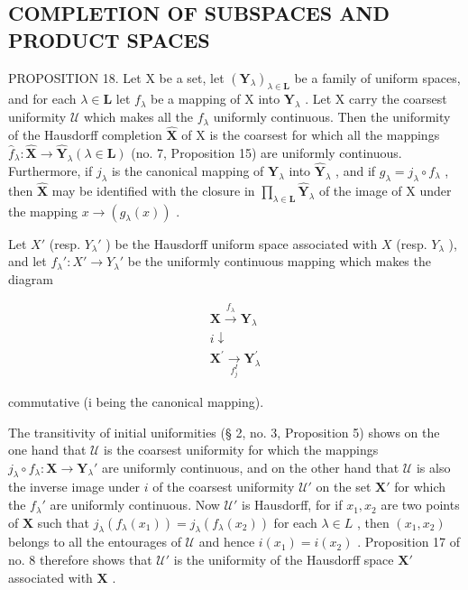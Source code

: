 \subsection{COMPLETION OF SUBSPACES AND PRODUCT SPACES}

PROPOSITION 18. Let X be a set, let \((\mathbf{Y}_{\lambda})_{\lambda \in \mathbf{L}}\) be a family of uniform spaces, and for each \(\lambda \in \mathbf{L}\) let \(f_{\lambda}\) be a mapping of X into \(\mathbf{Y}_{\lambda}\) . Let X carry the coarsest uniformity \(\mathcal{U}\) which makes all the \(f_{\lambda}\) uniformly continuous. Then the uniformity of the Hausdorff completion \(\hat{\mathbf{X}}\) of X is the coarsest for which all the mappings \(\hat{f}_{\lambda} \colon \hat{\mathbf{X}} \to \hat{\mathbf{Y}}_{\lambda} (\lambda \in \mathbf{L})\) (no. 7, Proposition 15) are uniformly continuous. Furthermore, if \(j_{\lambda}\) is the canonical mapping of \(\mathbf{Y}_{\lambda}\) into \(\hat{\mathbf{Y}}_{\lambda}\) , and if \(g_{\lambda} = j_{\lambda} \circ f_{\lambda}\) , then \(\hat{\mathbf{X}}\) may be identified with the closure in \(\prod_{\lambda \in \mathbf{L}} \hat{\mathbf{Y}}_{\lambda}\) of the image of X under the mapping \(x \to (g_{\lambda}(x))\) .

Let \(X'\) (resp. \(Y_{\lambda}'\) ) be the Hausdorff uniform space associated with \(X\) (resp. \(Y_{\lambda}\) ), and let \(f_{\lambda}' \colon X' \to Y_{\lambda}'\) be the uniformly continuous mapping which makes the diagram

\[
\begin{array}{c} \mathbf {X} \xrightarrow {f _ {\lambda}} \mathbf {Y} _ {\lambda} \\ i \downarrow \\ \mathbf {X ^ {\prime}} \xrightarrow [ f _ {j} ^ {I} ]{} \mathbf {Y} _ {\lambda} ^ {\prime} \end{array}
\]

commutative (i being the canonical mapping).

The transitivity of initial uniformities (§ 2, no. 3, Proposition 5) shows on the one hand that \(\mathcal{U}\) is the coarsest uniformity for which the mappings \(j_{\lambda} \circ f_{\lambda}: \mathbf{X} \to \mathbf{Y}_{\lambda}'\) are uniformly continuous, and on the other hand that \(\mathcal{U}\) is also the inverse image under \(i\) of the coarsest uniformity \(\mathcal{U}'\) on the set \(\mathbf{X}'\) for which the \(f_{\lambda}'\) are uniformly continuous. Now \(\mathcal{U}'\) is Hausdorff, for if \(x_{1}, x_{2}\) are two points of \(\mathbf{X}\) such that \(j_{\lambda}(f_{\lambda}(x_{1})) = j_{\lambda}(f_{\lambda}(x_{2}))\) for each \(\lambda \in L\) , then \((x_{1}, x_{2})\) belongs to all the entourages of \(\mathcal{U}\) and hence \(i(x_{1}) = i(x_{2})\) . Proposition 17 of no. 8 therefore shows that \(\mathcal{U}'\) is the uniformity of the Hausdorff space \(\mathbf{X}'\) associated with \(\mathbf{X}\) .

